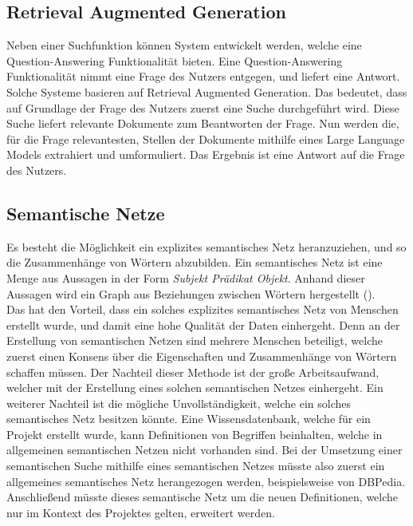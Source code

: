 \subsection{Retrieval Augmented Generation}
Neben einer Suchfunktion können System entwickelt werden, welche eine Question-Answering Funktionalität bieten.
Eine Question-Answering Funktionalität nimmt eine Frage des Nutzers entgegen, und liefert eine Antwort.
Solche Systeme basieren auf Retrieval Augmented Generation.
Das bedeutet, dass auf Grundlage der Frage des Nutzers zuerst eine Suche durchgeführt wird.
Diese Suche liefert relevante Dokumente zum Beantworten der Frage.
Nun werden die, für die Frage relevantesten, Stellen der Dokumente mithilfe eines Large Language Models extrahiert und umformuliert.
Das Ergebnis ist eine Antwort auf die Frage des Nutzers. 


\subsection{Semantische Netze}
Es besteht die Möglichkeit ein explizites semantisches Netz heranzuziehen, und so die Zusammenhänge von Wörtern abzubilden.
Ein semantisches Netz ist eine Menge aus Aussagen in der Form \textit{Subjekt Prädikat Objekt}.
Anhand dieser Aussagen wird ein Graph aus Beziehungen zwischen Wörtern hergestellt (\cite{Lehmann}).\\


Das hat den Vorteil, dass ein solches explizites semantisches Netz von Menschen erstellt wurde, und damit eine hohe Qualität der Daten einhergeht.
Denn an der Erstellung von semantischen Netzen sind mehrere Menschen beteiligt, welche zuerst einen Konsens über die Eigenschaften und Zusammenhänge von Wörtern schaffen müssen.
Der Nachteil dieser Methode ist der große Arbeitsaufwand, welcher mit der Erstellung eines solchen semantischen Netzes einhergeht.
Ein weiterer Nachteil ist die mögliche Unvollständigkeit, welche ein solches semantisches Netz besitzen könnte.
Eine Wissensdatenbank, welche für ein Projekt erstellt wurde, kann Definitionen von Begriffen beinhalten, welche in allgemeinen semantischen Netzen nicht vorhanden sind.
Bei der Umsetzung einer semantischen Suche mithilfe eines semantischen Netzes müsste also zuerst ein allgemeines semantisches Netz herangezogen werden, beispielsweise von DBPedia.
Anschließend müsste dieses semantische Netz um die neuen Definitionen, welche nur im Kontext des Projektes gelten, erweitert werden.\\


